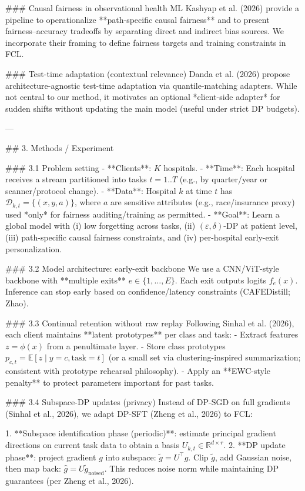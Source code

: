 ### Causal fairness in observational health ML  
Kashyap et al. (2026) provide a pipeline to operationalize **path-specific causal fairness** and to present fairness–accuracy tradeoffs by separating direct and indirect bias sources. We incorporate their framing to define fairness targets and training constraints in FCL.

### Test-time adaptation (contextual relevance)  
Danda et al. (2026) propose architecture-agnostic test-time adaptation via quantile-matching adapters. While not central to our method, it motivates an optional *client-side adapter* for sudden shifts without updating the main model (useful under strict DP budgets).

---

## 3. Methods / Experiment  

### 3.1 Problem setting  
- **Clients**: \(K\) hospitals.  
- **Time**: Each hospital receives a stream partitioned into tasks \(t=1..T\) (e.g., by quarter/year or scanner/protocol change).  
- **Data**: Hospital \(k\) at time \(t\) has \(\mathcal{D}_{k,t}=\{(x,y,a)\}\), where \(a\) are sensitive attributes (e.g., race/insurance proxy) used *only* for fairness auditing/training as permitted.  
- **Goal**: Learn a global model with (i) low forgetting across tasks, (ii) \((\varepsilon,\delta)\)-DP at patient level, (iii) path-specific causal fairness constraints, and (iv) per-hospital early-exit personalization.

### 3.2 Model architecture: early-exit backbone  
We use a CNN/ViT-style backbone with **multiple exits** \(e \in \{1,\dots,E\}\). Each exit outputs logits \(f_e(x)\). Inference can stop early based on confidence/latency constraints (CAFEDistill; Zhao).

### 3.3 Continual retention without raw replay  
Following Sinhal et al. (2026), each client maintains **latent prototypes** per class and task:
- Extract features \(z = \phi(x)\) from a penultimate layer.
- Store class prototypes \(p_{c,t} = \mathbb{E}[z \mid y=c, \text{task}=t]\) (or a small set via clustering-inspired summarization; consistent with prototype rehearsal philosophy).
- Apply an **EWC-style penalty** to protect parameters important for past tasks.

### 3.4 Subspace-DP updates (privacy)  
Instead of DP-SGD on full gradients (Sinhal et al., 2026), we adapt DP-SFT (Zheng et al., 2026) to FCL:

1. **Subspace identification phase (periodic)**: estimate principal gradient directions on current task data to obtain a basis \(U_{k,t}\in \mathbb{R}^{d \times r}\).  
2. **DP update phase**: project gradient \(g\) into subspace: \(\tilde g = U^\top g\). Clip \(\tilde g\), add Gaussian noise, then map back: \(\hat g = U \tilde g_{\text{noised}}\).  
This reduces noise norm while maintaining DP guarantees (per Zheng et al., 2026).

